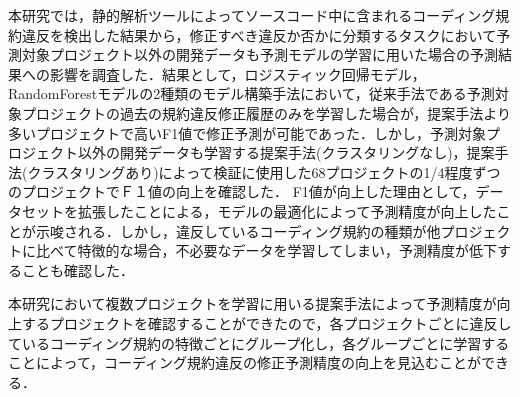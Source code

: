 \documentclass[submit,noauthor,ses,dvipdfmx]{ipsj}
\begin{document}
本研究では，静的解析ツールによってソースコード中に含まれるコーディング規約違反を検出した結果から，修正すべき違反か否かに分類するタスクにおいて予測対象プロジェクト以外の開発データも予測モデルの学習に用いた場合の予測結果への影響を調査した．結果として，ロジスティック回帰モデル，RandomForestモデルの2種類のモデル構築手法において，従来手法である予測対象プロジェクトの過去の規約違反修正履歴のみを学習した場合が，提案手法より多いプロジェクトで高いF1値で修正予測が可能であった．しかし，予測対象プロジェクト以外の開発データも学習する提案手法(クラスタリングなし)，提案手法(クラスタリングあり)によって検証に使用した68プロジェクトの1/4程度ずつのプロジェクトでＦ１値の向上を確認した．
F1値が向上した理由として，データセットを拡張したことによる，モデルの最適化によって予測精度が向上したことが示唆される．しかし，違反しているコーディング規約の種類が他プロジェクトに比べて特徴的な場合，不必要なデータを学習してしまい，予測精度が低下することも確認した．

本研究において複数プロジェクトを学習に用いる提案手法によって予測精度が向上するプロジェクトを確認することができたので，各プロジェクトごとに違反しているコーディング規約の特徴ごとにグループ化し，各グループごとに学習することによって，コーディング規約違反の修正予測精度の向上を見込むことができる．



\end{document}
